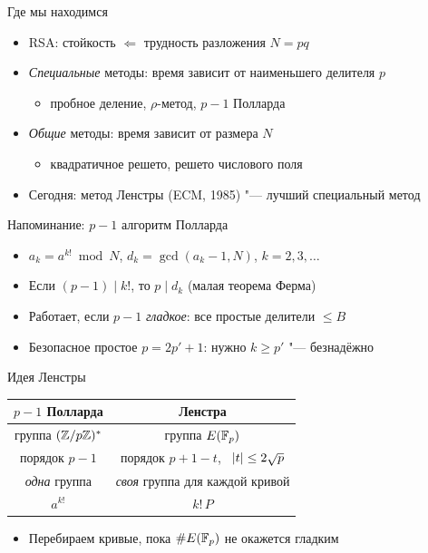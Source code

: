 \documentclass{ca-slides}
\author{}
\begin{document}
\titleframe

\begin{canvasframe}{Где мы находимся}
  \begin{itemize}
    \item RSA: стойкость $\Leftarrow$ трудность разложения $N = pq$
    \item \emph{Специальные} методы: время зависит от наименьшего делителя $p$
      \begin{itemize}
        \item пробное деление, $\rho$-метод, $p - 1$ Полларда
      \end{itemize}
    \item \emph{Общие} методы: время зависит от размера $N$
      \begin{itemize}
        \item квадратичное решето, решето числового поля
      \end{itemize}
    \item Сегодня: метод Ленстры (ECM, 1985) "--- лучший специальный метод
  \end{itemize}
\end{canvasframe}

\begin{canvasframe}{Напоминание: $p - 1$ алгоритм Полларда}
  \begin{itemize}
    \item $a_k = a^{k!} \bmod N$, \quad $d_k = \gcd(a_k - 1, N)$, \quad $k = 2, 3, \dots$
    \item Если $(p - 1) \mid k!$, то $p \mid d_k$ (малая теорема Ферма)
    \item Работает, если $p - 1$ \emph{гладкое}: все простые делители $\le B$
    \item Безопасное простое $p = 2p' + 1$: нужно $k \ge p'$ "--- безнадёжно
  \end{itemize}
  \penspace[0.12\textheight]
\end{canvasframe}

\begin{canvasframe}{Идея Ленстры}
  \centering
  \begin{tabular}{c|c}
    $p - 1$ Полларда & Ленстра \\ \hline
    группа $(\mathbb{Z}/p\mathbb{Z})^{*}$ & группа $E(\mathbb{F}_p)$ \\
    порядок $p - 1$ & порядок $p + 1 - t$, \ $\lvert t\rvert \le 2\sqrt p$ \\
    \emph{одна} группа & \emph{своя} группа для каждой кривой \\
    $a^{k!}$ & $k!\,P$
  \end{tabular}
  \bigskip
  \begin{itemize}
    \item Перебираем кривые, пока $\#E(\mathbb{F}_p)$ не окажется гладким
  \end{itemize}
  \penspace[0.15\textheight]
\end{canvasframe}
\end{document}
